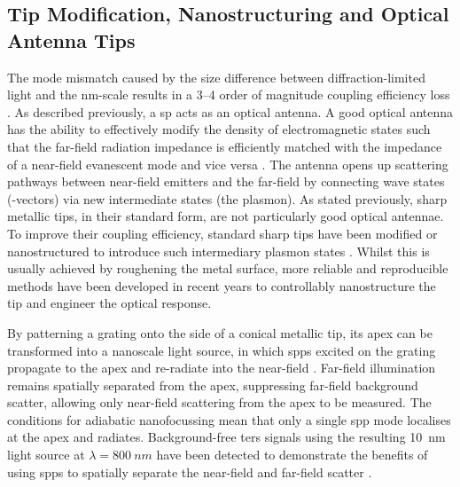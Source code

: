 \documentclass{article}
\begin{document}
\subsection{Tip Modification, Nanostructuring and Optical Antenna Tips}

The mode mismatch caused by the size difference between diffraction-limited light and the nm-scale results in a 3--4 order of magnitude coupling efficiency loss \cite{berweger2010}. As described previously, a \gls{sp} acts as an optical antenna. A good optical antenna has the ability to effectively modify the density of electromagnetic states such that the far-field radiation impedance is efficiently matched with the impedance of a near-field evanescent mode and vice versa \cite{novotny2006, novotny2011}. The antenna opens up scattering pathways between near-field emitters and the far-field by connecting wave states (\wvm-vectors) via new intermediate states (the plasmon). As stated previously, sharp metallic tips, in their standard form, are not particularly good optical antennae. To improve their coupling efficiency, standard sharp tips have been modified or nanostructured to introduce such intermediary plasmon states \cite{mauser2014}. Whilst this is usually achieved by roughening the metal surface, more reliable and reproducible methods have been developed in recent years to controllably nanostructure the tip and engineer the optical response.

By patterning a grating onto the side of a conical metallic tip, its apex can be transformed into a nanoscale light source, in which \glspl{spp} excited on the grating propagate to the apex and re-radiate into the near-field \cite{neacsu2010}. Far-field illumination remains spatially separated from the apex, suppressing far-field background scatter, allowing only near-field scattering from the apex to be measured. The conditions for adiabatic nanofocussing mean that only a single \gls{spp} mode localises at the apex and radiates. Background-free \gls{ters} signals using the resulting \SI{10}{nm} light source at $\lambda=\SI{800}{nm}$ have been detected to demonstrate the benefits of using \glspl{spp} to spatially separate the near-field and far-field scatter \cite{berweger2010, berweger2012}.
\end{document}
